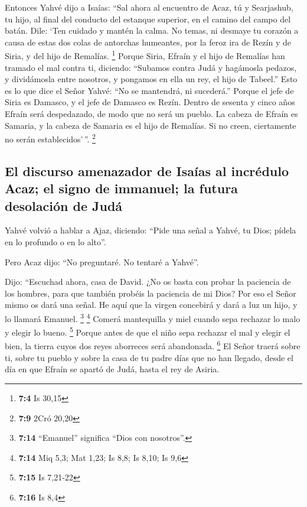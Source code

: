 \begin{paracol}{2}
 Entonces Yahvé dijo a Isaías: ``Sal ahora al encuentro de
Acaz, tú y Searjashub, tu hijo, al final del conducto del estanque
superior, en el camino del campo del batán.  Dile: `Ten
cuidado y mantén la calma. No temas, ni desmaye tu corazón a causa de
estas dos colas de antorchas humeantes, por la feroz ira de Rezín y de
Siria, y del hijo de Remalías. \footnote{\textbf{7:4} Is 30,15}
 Porque Siria, Efraín y el hijo de Remalías han tramado el
mal contra ti, diciendo:  ``Subamos contra Judá y
hagámosla pedazos, y dividámosla entre nosotros, y pongamos en ella un
rey, el hijo de Tabeel.''  Esto es lo que dice el Señor
Yahvé: ``No se mantendrá, ni sucederá.''  Porque el jefe
de Siria es Damasco, y el jefe de Damasco es Rezín. Dentro de sesenta y
cinco años Efraín será despedazado, de modo que no será un pueblo.
 La cabeza de Efraín es Samaria, y la cabeza de Samaria es
el hijo de Remalías. Si no creen, ciertamente no serán
establecidos'\,''. \footnote{\textbf{7:9} 2Cró 20,20}

\hypertarget{el-discurso-amenazador-de-isauxedas-al-incruxe9dulo-acaz-el-signo-de-immanuel-la-futura-desolaciuxf3n-de-juduxe1}{%
\subsection{El discurso amenazador de Isaías al incrédulo Acaz; el signo
de immanuel; la futura desolación de
Judá}\label{el-discurso-amenazador-de-isauxedas-al-incruxe9dulo-acaz-el-signo-de-immanuel-la-futura-desolaciuxf3n-de-juduxe1}}

 Yahvé volvió a hablar a Ajaz, diciendo: 
``Pide una señal a Yahvé, tu Dios; pídela en lo profundo o en lo alto''.

 Pero Acaz dijo: ``No preguntaré. No tentaré a Yahvé''.

 Dijo: ``Escuchad ahora, casa de David. ¿No os basta con
probar la paciencia de los hombres, para que también probéis la
paciencia de mi Dios?  Por eso el Señor mismo os dará una
señal. He aquí que la virgen concebirá y dará a luz un hijo, y lo
llamará Emanuel. \footnote{\textbf{7:14} ``Emanuel'' significa ``Dios
  con nosotros''.} \footnote{\textbf{7:14} Miq 5,3; Mat 1,23; Is 8,8; Is
  8,10; Is 9,6}  Comerá mantequilla y miel cuando sepa
rechazar lo malo y elegir lo bueno. \footnote{\textbf{7:15} Is 7,21-22}
 Porque antes de que el niño sepa rechazar el mal y
elegir el bien, la tierra cuyos dos reyes aborreces será abandonada.
\footnote{\textbf{7:16} Is 8,4}  El Señor traerá sobre
ti, sobre tu pueblo y sobre la casa de tu padre días que no han llegado,
desde el día en que Efraín se apartó de Judá, hasta el rey de Asiria.


\end{paracol}
